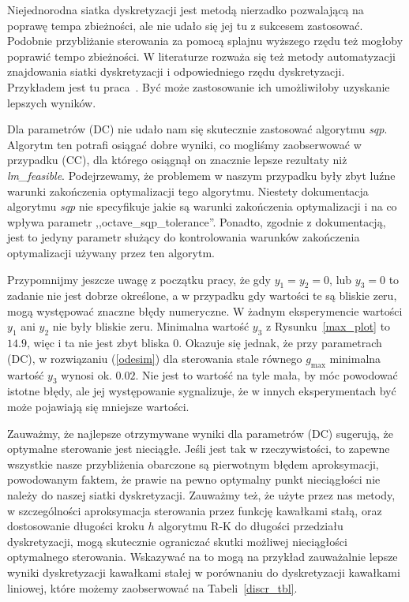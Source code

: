\documentclass[licencjacka]{pracamgr}
\begin{document}
Niejednorodna siatka dyskretyzacji jest metodą nierzadko pozwalającą na poprawę tempa zbieżności, ale nie udało się jej tu z sukcesem zastosować. Podobnie przybliżanie sterowania za pomocą splajnu wyższego rzędu też mogłoby poprawić tempo zbieżności. W literaturze rozważa się też metody automatyzacji znajdowania siatki dyskretyzacji i odpowiedniego rzędu dyskretyzacji. Przykładem jest tu praca~\cite{Rao-ph}. Być może zastosowanie ich umożliwiłoby uzyskanie lepszych wyników.

Dla parametrów (DC) nie udało nam się skutecznie zastosować algorytmu {\it sqp}. Algorytm ten potrafi osiągać dobre wyniki, co mogliśmy zaobserwować w przypadku (CC), dla którego osiągnął on znacznie lepsze rezultaty niż {\it lm\_feasible}. Podejrzewamy, że problemem w naszym przypadku były zbyt luźne warunki zakończenia optymalizacji tego algorytmu.  Niestety dokumentacja algorytmu {\it sqp\/}  nie specyfikuje jakie są warunki zakończenia optymalizacji i na co wpływa parametr ,,octave\_sqp\_tolerance''. Ponadto, zgodnie z dokumentacją, jest to jedyny parametr służący do kontrolowania warunków zakończenia optymalizacji używany przez ten algorytm.

Przypomnijmy jeszcze uwagę z początku pracy, że gdy $y_1 = y_2 = 0$, lub $y_3 = 0$ to zadanie nie jest dobrze określone, a w przypadku gdy wartości te są bliskie zeru, mogą występować znaczne błędy numeryczne. W żadnym eksperymencie wartości $y_1$ ani $y_2$ nie były bliskie zeru. Minimalna wartość $y_3$ z Rysunku~\ref{max_plot} to $14.9$, więc i ta nie jest zbyt bliska 0. Okazuje się jednak, że przy parametrach (DC), w rozwiązaniu (\ref{odesim}) dla sterowania stale równego $g_{\max}$ minimalna wartość $y_3$ wynosi ok. $0.02$. Nie jest to wartość na tyle mała, by móc powodować istotne błędy, ale jej występowanie sygnalizuje, że w innych eksperymentach być może pojawiają się mniejsze wartości.

Zauważmy, że najlepsze otrzymywane wyniki dla parametrów (DC) sugerują, że optymalne sterowanie jest nieciągłe. Jeśli jest tak w rzeczywistości, to zapewne wszystkie nasze przybliżenia obarczone są pierwotnym błędem aproksymacji, powodowanym faktem, że prawie na pewno optymalny punkt nieciągłości nie należy do naszej siatki dyskretyzacji. Zauważmy też, że użyte przez nas metody, w szczególności aproksymacja sterowania przez funkcję kawałkami stałą, oraz dostosowanie długości kroku $h$ algorytmu R-K do długości przedziału dyskretyzacji, mogą skutecznie ograniczać skutki możliwej nieciągłości optymalnego sterowania. Wskazywać na to mogą na przykład zauważalnie lepsze wyniki dyskretyzacji kawałkami stałej w porównaniu do dyskretyzacji kawałkami liniowej, które możemy zaobserwować na Tabeli~\ref{discr_tbl}.
\end{document}
